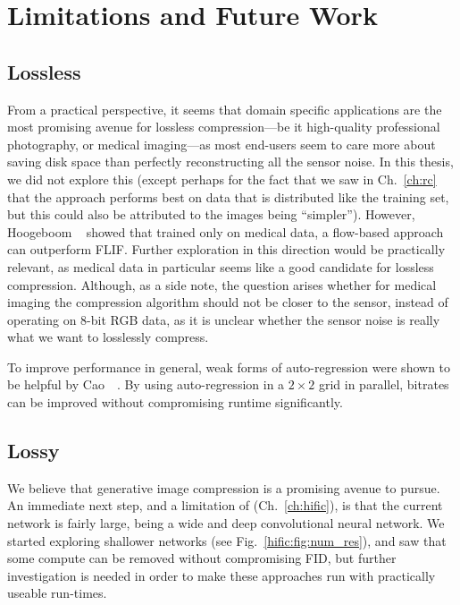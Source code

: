 \section{Limitations and Future Work}

\subsection{Lossless}

From a practical perspective, it seems that domain specific applications are
the most promising avenue for lossless compression---be it high-quality
professional photography, or medical imaging---as most end-users seem to care
more about saving disk space than perfectly reconstructing all the sensor
noise. In this thesis, we did not explore this (except perhaps for the fact
that we saw in Ch.~\ref{ch:rc} that the approach performs best on data that is
distributed like the training set, but this could also be attributed to the
images being ``simpler''). However, Hoogeboom \etal~\cite{hoogeboom2019integer}
showed that trained only on medical data, a flow-based approach can outperform
FLIF. Further exploration in this direction would be practically relevant, as
medical data in particular seems like a good candidate for lossless
compression. Although, as a side note, the question arises whether for medical
imaging the compression algorithm should not be closer to the sensor, instead
of operating on 8-bit RGB data, as it is unclear whether the sensor noise is
really what we want to losslessly compress.

To improve performance in general, weak forms of auto-regression were shown to
be helpful by Cao~\etal~\cite{cao2020lossless}. By using auto-regression in a
$2{\times}2$ grid in parallel, bitrates can be improved without compromising
runtime significantly.

\subsection{Lossy}

We believe that generative image compression is a promising avenue to pursue.
An immediate next step, and a limitation of \name (Ch.~\ref{ch:hific}), is that
the current network is fairly large, being a wide and deep convolutional neural
network. We started exploring shallower networks (see
Fig.~\ref{hific:fig:num_res}), and saw that some compute can be removed without
compromising FID, but further investigation is needed in order to make these
approaches run with practically useable run-times.

